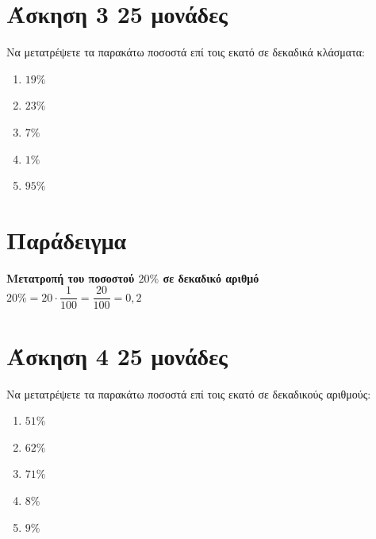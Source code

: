 \documentclass[a4paper,10pt]{report}
\begin{document}
\section*{Άσκηση 3  \hfill \small{25 μονάδες}}
Να μετατρέψετε τα παρακάτω ποσοστά επί τοις εκατό σε δεκαδικά κλάσματα:
\begin{enumerate}[1)]
 \item $19\%$
 \item $23\%$
 \item $7\%$
 \item $1\%$
 \item $95\%$
\end{enumerate}


\section*{Παράδειγμα \hfill \small{}}
\textbf{Μετατροπή του  ποσοστού $20\%$ σε δεκαδικό αριθμό }\\
$20\% =20\cdot \dfrac{1}{100} =\dfrac{20}{100}=0,2$




\section*{Άσκηση 4  \hfill \small{25 μονάδες}}
Να μετατρέψετε τα παρακάτω  ποσοστά επί τοις εκατό σε δεκαδικούς αριθμούς:
\begin{enumerate}[1)]
 \item $51\%$
 \item $62\%$
 \item $71\%$
 \item $8\%$
 \item $9\%$
\end{enumerate}

\end{document}
